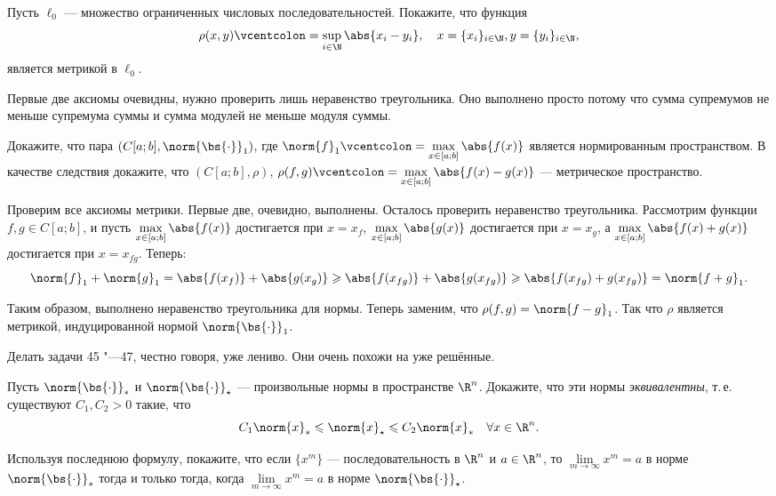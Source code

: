 \begin{problem}[43]
    Пусть $\ell_0$ --- множество ограниченных числовых последовательностей. Покажите, что функция
    \[
        \rho(x, y) \vcentcolon = \sup\limits_{i \in \N}\abs{x_i - y_i},\quad x = \{x_i\}_{i \in \N}, y = \{y_i\}_{i \in \N},
    \]
    является метрикой в $\ell_0$.
\end{problem}

\begin{solution}
    Первые две аксиомы очевидны, нужно проверить лишь неравенство треугольника. Оно выполнено просто потому что сумма супремумов не меньше супремума суммы и сумма модулей не меньше модуля суммы.
\end{solution}

\begin{problem}[44$^\circ$]
    Докажите, что пара $(C[a; b], \norm{\bs{\cdot}}_1)$, где $\norm{f}_1 \vcentcolon = \max\limits_{x \in [a; b]}\abs{f(x)}$ является нормированным пространством. В качестве следствия докажите, что $(C[a; b], \rho)$, $\rho(f, g) \vcentcolon = \max\limits_{x \in [a; b]}\abs{f(x) - g(x)}$ --- метрическое пространство.
\end{problem}

\begin{solution}
    Проверим все аксиомы метрики. Первые две, очевидно, выполнены. Осталось проверить неравенство треугольника. Рассмотрим функции $f, g \in C[a; b]$, и пусть $\max\limits_{x \in [a; b]}\abs{f(x)}$ достигается при $x = x_f$, $\max\limits_{x \in [a; b]}\abs{g(x)}$ достигается при $x = x_g$, а $\max\limits_{x \in [a; b]}\abs{f(x) + g(x)}$ достигается при $x = x_{fg}$. Теперь:
    \[
        \norm{f}_1 + \norm{g}_1 = \abs{f(x_f)} + \abs{g(x_g)} \geqslant \abs{f(x_{fg})} + \abs{g(x_{fg})} \geqslant \abs{f(x_{fg}) + g(x_{fg})} = \norm{f + g}_1.
    \]

    Таким образом, выполнено неравенство треугольника для нормы. Теперь заменим, что $\rho(f, g) = \norm{f - g}_1$. Так что $\rho$ является метрикой, индуцированной нормой $\norm{\bs{\cdot}}_1$.
\end{solution}

Делать задачи 45 "---47, честно говоря, уже лениво. Они очень похожи на уже решённые.

\begin{problem}[48]
    Пусть $\norm{\bs{\cdot}}_\ast$ и $\norm{\bs{\cdot}}_\star$ --- произвольные нормы в пространстве $\R^n$. Докажите, что эти нормы \textit{эквивалентны}, т.\,е. существуют $C_1, C_2 > 0$ такие, что
    \[
        C_1\norm{x}_\ast \leqslant \norm{x}_\star \leqslant C_2\norm{x}_\ast\quad\forall x \in \R^n.
    \]

    Используя последнюю формулу, покажите, что если $\{x^m\}$ --- последовательность в $\R^n$ и $a \in \R^n$, то $\lim\limits_{m \to \infty}x^m = a$ в норме $\norm{\bs{\cdot}}_\ast$ тогда и только тогда, когда $\lim\limits_{m \to \infty}x^m = a$ в норме $\norm{\bs{\cdot}}_\star$.
\end{problem}

